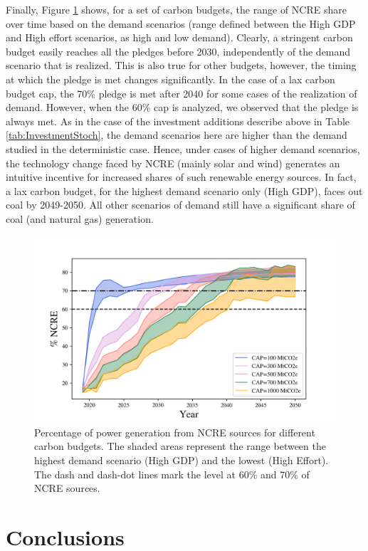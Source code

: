 \documentclass[11pt, letterpaper]{article}
\begin{document}
Finally, Figure \ref{fig:ernc_percent_shadows} shows, for a set of carbon budgets, the range of NCRE share over time based on the demand scenarios (range defined between the High GDP and High effort scenarios, as high and low demand). Clearly, a stringent carbon budget easily reaches all the pledges before 2030, independently of the demand scenario that is realized. This is also true for other budgets, however, the timing at which the pledge is met changes significantly. In the case of a lax carbon budget cap, the 70\% pledge is met after 2040 for some cases of the realization of demand. However, when the 60\% cap is analyzed, we observed that the pledge is always met. As in the case of the investment additions describe above in Table \ref{tab:InvestmentStoch}, the demand scenarios here are higher than the demand studied in the deterministic case. Hence, under cases of higher demand scenarios, the technology change faced by NCRE (mainly solar and wind) generates an intuitive incentive for increased shares of such renewable energy sources. In fact, a lax carbon budget, for the highest demand scenario only (High GDP), faces out coal by 2049-2050. All other scenarios of demand still have a significant share of coal (and natural gas) generation. 

\begin{figure}[ht!]
\centering
 \includegraphics[width=4.5in]{draft_paper/Figures/ernc_percent_shadows.png}
 \caption{Percentage of power generation from NCRE sources for different carbon budgets. The shaded areas represent the range between the highest demand scenario (High GDP) and the lowest (High Effort). The dash and dash-dot lines mark the level at 60\% and 70\% of NCRE sources.}
  \label{fig:ernc_percent_shadows}
  \end{figure}

\section{Conclusions}\label{sec:concl}
\end{document}
